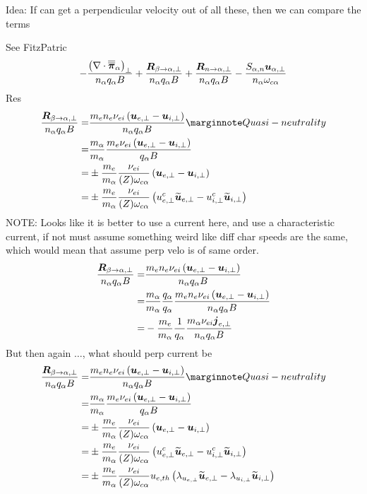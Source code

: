 Idea: If can get a perpendicular velocity out of all these, then we can compare
the terms

See FitzPatric
%
\begin{align*}
- \frac{ \left(\nabla\cdot\boldsymbol{\overline{\overline{\pi}}}_\alpha\right)_\perp }{n_\alpha  q_\alpha B}
+ \frac{ \boldsymbol{R}_{\beta \to \alpha,\perp} }{n_\alpha q_\alpha B}
+ \frac{ \boldsymbol{R}_{n \to \alpha,\perp} }{n_\alpha q_\alpha B}
- \frac{ S_{\alpha,n}\boldsymbol{u}_{\alpha,\perp} }{n_\alpha \omega_{c\alpha}}
\end{align*}
%
Res
%
\begin{align*}
\frac{ \ve{R}_{\beta \to \a,\perp} }{n_\a q_\a B}
=&
\frac{ m_en_e\nu_{ei}\L(\ve{u}_{e,\perp}-\ve{u}_{i,\perp}\R) }{n_\a q_\a B}
\note{Quasi-neutrality}
\\
=&
\frac{m_\a}{m_\a}
\frac{ m_e\nu_{ei}\L(\ve{u}_{e,\perp}-\ve{u}_{i,\perp}\R) }{q_\a B}
\\
=&
\pm
\frac{m_e}{m_\a}
\frac{\nu_{ei} }{(Z) \om_{c\a}}
\L(\ve{u}_{e,\perp}-\ve{u}_{i,\perp}\R)
\\
=&
\pm
\frac{m_e}{m_\a}
\frac{\nu_{ei} }{(Z) \om_{c\a}}
\L(u^c_{e,\perp}\wt{\ve{u}}_{e,\perp}-u^c_{i,\perp}\wt{\ve{u}}_{i,\perp}\R)
\end{align*}
%
NOTE: Looks like it is better to use a current here, and use a characteristic current, if not must assume something weird like diff char speeds are the same, which would mean that assume perp velo is of same order.
%
\begin{align*}
\frac{ \ve{R}_{\beta \to \a,\perp} }{n_\a q_\a B}
=&
\frac{ m_en_e\nu_{ei}\L(\ve{u}_{e,\perp}-\ve{u}_{i,\perp}\R) }{n_\a q_\a B}
\\
%
%
=&
\frac{m_\a}{m_\a}
\frac{q_\a}{q_\a}
\frac{ m_en_e\nu_{ei}\L(\ve{u}_{e,\perp}-\ve{u}_{i,\perp}\R) }{n_\a q_\a B}
\\
%
%
=&
-
\frac{ m_e}{m_\a}
\frac{1}{q_\a}
\frac{m_\a \nu_{ei}\ve{j}_{e,\perp} }{n_\a q_\a B}
\end{align*}
%
But then again $\ldots$, what should perp current be
%
\begin{align*}
\frac{ \ve{R}_{\beta \to \a,\perp} }{n_\a q_\a B}
=&
\frac{ m_en_e\nu_{ei}\L(\ve{u}_{e,\perp}-\ve{u}_{i,\perp}\R) }{n_\a q_\a B}
\note{Quasi-neutrality}
\\
=&
\frac{m_\a}{m_\a}
\frac{ m_e\nu_{ei}\L(\ve{u}_{e,\perp}-\ve{u}_{i,\perp}\R) }{q_\a B}
\\
=&
\pm
\frac{m_e}{m_\a}
\frac{\nu_{ei} }{(Z) \om_{c\a}}
\L(\ve{u}_{e,\perp}-\ve{u}_{i,\perp}\R)
\\
=&
\pm
\frac{m_e}{m_\a}
\frac{\nu_{ei} }{(Z) \om_{c\a}}
\L(u^c_{e,\perp}\wt{\ve{u}}_{e,\perp}-u^c_{i,\perp}\wt{\ve{u}}_{i,\perp}\R)
\\
=&
\pm
\frac{m_e}{m_\a}
\frac{\nu_{ei} }{(Z) \om_{c\a}}
u_{e,th}
\L( \lambda_{u_{e,\perp}}\wt{\ve{u}}_{e,\perp}-\lambda_{u_{i,\perp}}\wt{\ve{u}}_{i,\perp}\R)
\end{align*}
